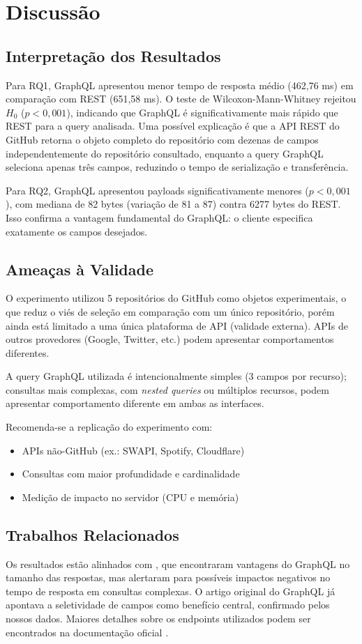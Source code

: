 \section{Discussão}

\subsection{Interpretação dos Resultados}

Para RQ1, GraphQL apresentou menor tempo de resposta médio (462,76 ms)
em comparação com REST (651,58 ms). O teste de Wilcoxon-Mann-Whitney
rejeitou $H_0$ ($p < 0,001$), indicando que GraphQL é significativamente
mais rápido que REST para a query analisada. Uma possível explicação é que
a API REST do GitHub retorna o objeto completo do repositório com dezenas
de campos independentemente do repositório consultado, enquanto a query
GraphQL seleciona apenas três campos, reduzindo o tempo de serialização
e transferência.

Para RQ2, GraphQL apresentou payloads significativamente menores
($p < 0,001$), com mediana de 82 bytes (variação de 81 a 87)
contra 6277 bytes do REST. Isso confirma a vantagem fundamental do
GraphQL: o cliente especifica exatamente os campos desejados.

\subsection{Ameaças à Validade}

O experimento utilizou 5 repositórios do GitHub como objetos experimentais,
o que reduz o viés de seleção em comparação com um único repositório,
porém ainda está limitado a uma única plataforma de API (validade externa).
APIs de outros provedores (Google, Twitter, etc.) podem apresentar
comportamentos diferentes.

A query GraphQL utilizada é intencionalmente simples (3 campos por recurso);
consultas mais complexas, com \emph{nested queries} ou múltiplos recursos,
podem apresentar comportamento diferente em ambas as interfaces.

Recomenda-se a replicação do experimento com:
\begin{itemize}
    \item APIs não-GitHub (ex.: SWAPI, Spotify, Cloudflare)
    \item Consultas com maior profundidade e cardinalidade
    \item Medição de impacto no servidor (CPU e memória)
\end{itemize}

\subsection{Trabalhos Relacionados}

Os resultados estão alinhados com \cite{brito2019graphql}, que encontraram
vantagens do GraphQL no tamanho das respostas, mas alertaram para possíveis
impactos negativos no tempo de resposta em consultas complexas. O artigo
original do GraphQL \cite{lee2015graphql} já apontava a seletividade de campos
como benefício central, confirmado pelos nossos dados. Maiores detalhes sobre
os endpoints utilizados podem ser encontrados na documentação oficial
\cite{github2024api}.
